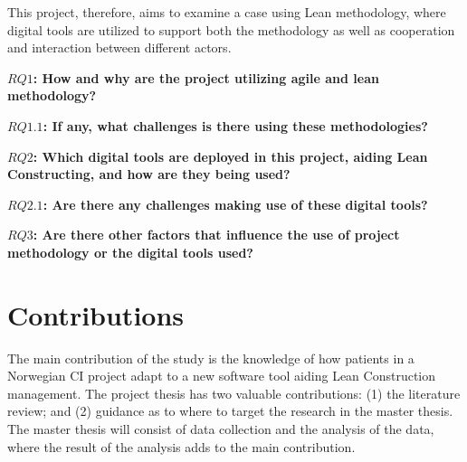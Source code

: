 This project, therefore, aims to examine a case using Lean methodology, where digital tools are utilized to support both the methodology as well as cooperation and interaction between different actors.

{\bf $RQ1$: How and why are the project utilizing agile and lean methodology?}

{\bf $RQ1.1$: If any, what challenges is there using these methodologies?}

{\bf $RQ2$: Which digital tools are deployed in this project, aiding Lean Constructing, and how are they being used?}

{\bf $RQ2.1$: Are there any challenges making use of these digital tools?}

{\bf $RQ3$: Are there other factors that influence the use of project methodology or the digital tools used?}

\section*{Contributions}



The main contribution of the study is the knowledge of how patients in a Norwegian CI project adapt to a new software tool aiding Lean Construction management. The project thesis has two valuable contributions: (1) the literature review; and (2) guidance as to where to target the research in the master thesis. The master thesis will consist of data collection and the analysis of the data, where the result of the analysis adds to the main contribution. 

